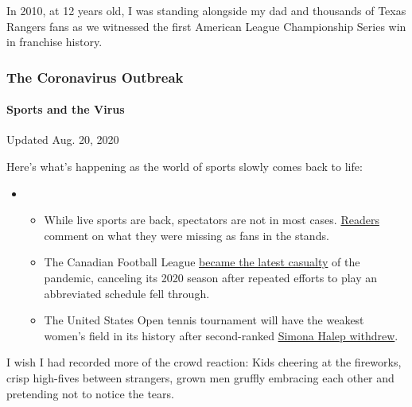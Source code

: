 In 2010, at 12 years old, I was standing alongside my dad and thousands
of Texas Rangers fans as we witnessed the first American League
Championship Series win in franchise history.

\hypertarget{the-coronavirus-outbreak}{%
\subsubsection{The Coronavirus
Outbreak}\label{the-coronavirus-outbreak}}

\hypertarget{sports-and-the-virus}{%
\paragraph{Sports and the Virus}\label{sports-and-the-virus}}

Updated Aug. 20, 2020

Here's what's happening as the world of sports slowly comes back to
life:

\begin{itemize}
\item
  \begin{itemize}
  \tightlist
  \item
    While live sports are back, spectators are not in most cases.
    \href{https://www.nytimes3xbfgragh.onion/2020/08/19/sports/empty-stadiums-live-fans.html?action=click\&pgtype=Article\&state=default\&region=MAIN_CONTENT_2\&context=storylines_keepup}{Readers}
    comment on what they were missing as fans in the stands.
  \item
    The Canadian Football League
    \href{https://www.nytimes3xbfgragh.onion/2020/08/18/sports/cfl-season-canceled.html?action=click\&pgtype=Article\&state=default\&region=MAIN_CONTENT_2\&context=storylines_keepup}{became
    the latest casualty} of the pandemic, canceling its 2020 season
    after repeated efforts to play an abbreviated schedule fell through.
  \item
    The United States Open tennis tournament will have the weakest
    women's field in its history after second-ranked
    \href{https://www.nytimes3xbfgragh.onion/2020/08/17/sports/tennis/us-open-women.html?action=click\&pgtype=Article\&state=default\&region=MAIN_CONTENT_2\&context=storylines_keepup}{Simona
    Halep withdrew}.
  \end{itemize}
\end{itemize}

I wish I had recorded more of the crowd reaction: Kids cheering at the
fireworks, crisp high-fives between strangers, grown men gruffly
embracing each other and pretending not to notice the tears.

